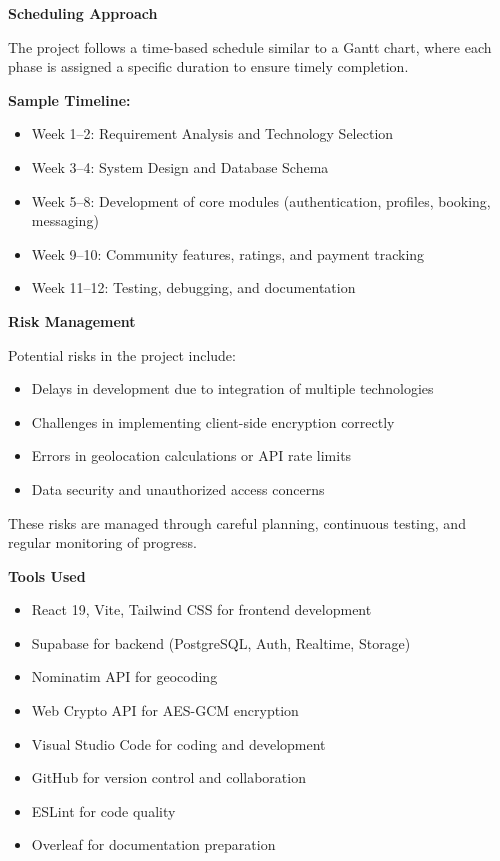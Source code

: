 \documentclass[12pt,a4paper]{report}
\begin{document}
\textbf{Scheduling Approach}

The project follows a time-based schedule similar to a Gantt chart, where each phase is assigned a specific duration to ensure timely completion.

\textbf{Sample Timeline:}

\begin{itemize}
\item Week 1--2: Requirement Analysis and Technology Selection
\item Week 3--4: System Design and Database Schema
\item Week 5--8: Development of core modules (authentication, profiles, booking, messaging)
\item Week 9--10: Community features, ratings, and payment tracking
\item Week 11--12: Testing, debugging, and documentation
\end{itemize}

\textbf{Risk Management}

Potential risks in the project include:

\begin{itemize}
\item Delays in development due to integration of multiple technologies
\item Challenges in implementing client-side encryption correctly
\item Errors in geolocation calculations or API rate limits
\item Data security and unauthorized access concerns
\end{itemize}

These risks are managed through careful planning, continuous testing, and regular monitoring of progress.

\textbf{Tools Used}

\begin{itemize}
\item React 19, Vite, Tailwind CSS for frontend development
\item Supabase for backend (PostgreSQL, Auth, Realtime, Storage)
\item Nominatim API for geocoding
\item Web Crypto API for AES-GCM encryption
\item Visual Studio Code for coding and development
\item GitHub for version control and collaboration
\item ESLint for code quality
\item Overleaf for documentation preparation
\end{itemize}
\end{document}
